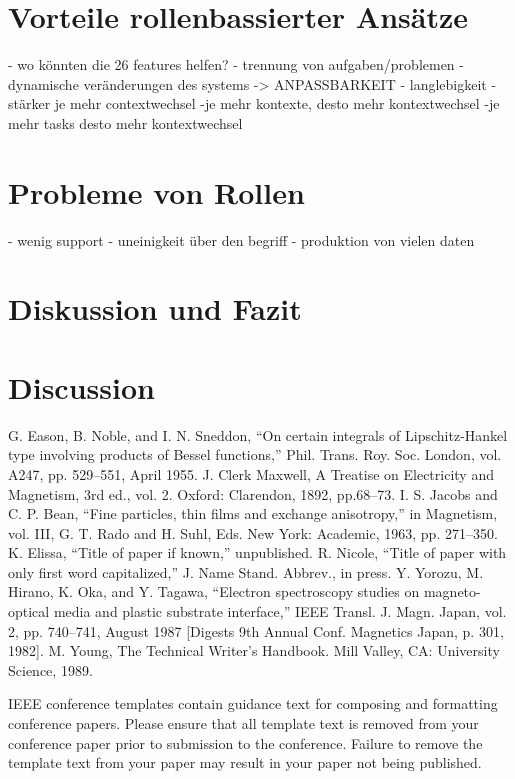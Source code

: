 \documentclass[conference]{IEEEtran}
\begin{document}
\section{Vorteile rollenbassierter Ansätze}
- wo könnten die 26 features helfen? 
- trennung von aufgaben/problemen
- dynamische veränderungen des systems -> ANPASSBARKEIT
- langlebigkeit
- stärker je mehr contextwechsel
	-je mehr kontexte, desto mehr kontextwechsel
		-je mehr tasks desto mehr kontextwechsel

\section{Probleme von Rollen}
- wenig support
- uneinigkeit über den begriff 
- produktion von vielen daten


\section{Diskussion und Fazit}


\section{Discussion}



\begin{thebibliography}{00}
 G. Eason, B. Noble, and I. N. Sneddon, ``On certain integrals of Lipschitz-Hankel type involving products of Bessel functions,'' Phil. Trans. Roy. Soc. London, vol. A247, pp. 529--551, April 1955.
 J. Clerk Maxwell, A Treatise on Electricity and Magnetism, 3rd ed., vol. 2. Oxford: Clarendon, 1892, pp.68--73.
 I. S. Jacobs and C. P. Bean, ``Fine particles, thin films and exchange anisotropy,'' in Magnetism, vol. III, G. T. Rado and H. Suhl, Eds. New York: Academic, 1963, pp. 271--350.
 K. Elissa, ``Title of paper if known,'' unpublished.
 R. Nicole, ``Title of paper with only first word capitalized,'' J. Name Stand. Abbrev., in press.
 Y. Yorozu, M. Hirano, K. Oka, and Y. Tagawa, ``Electron spectroscopy studies on magneto-optical media and plastic substrate interface,'' IEEE Transl. J. Magn. Japan, vol. 2, pp. 740--741, August 1987 [Digests 9th Annual Conf. Magnetics Japan, p. 301, 1982].
 M. Young, The Technical Writer's Handbook. Mill Valley, CA: University Science, 1989.
\end{thebibliography}
\vspace{12pt}
\color{red}
IEEE conference templates contain guidance text for composing and formatting conference papers. Please ensure that all template text is removed from your conference paper prior to submission to the conference. Failure to remove the template text from your paper may result in your paper not being published.
\end{document}
